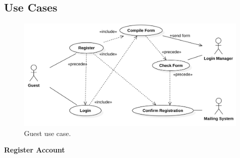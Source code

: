 \documentclass{report}
\begin{document}
\newpage

\subsection{Use Cases}

\begin{figure}[ht!]
\begin{center}
\includegraphics[width=\textwidth]{./img/UseCase1.png}
\end{center}
\caption{Guest use case.}
\label{fig:UseCase1}
\end{figure}
\begin{center}
	\textbf{Register Account}
\end{center}
\end{document}
